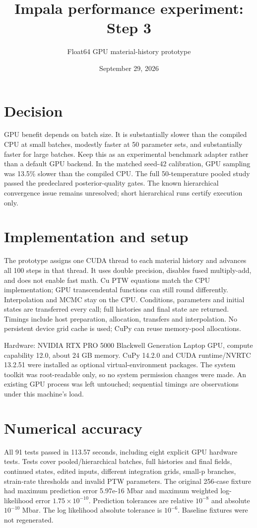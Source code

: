 \documentclass[11pt]{article}
\title{Impala performance experiment: Step 3}
\author{Float64 GPU material-history prototype}
\date{September 29, 2026}
\begin{document}
\maketitle
\section*{Decision}
GPU benefit depends on batch size. It is substantially slower than the compiled
CPU at small batches, modestly faster at 50 parameter sets, and substantially
faster for large batches. Keep this as an experimental benchmark adapter rather
than a default GPU backend. In the matched seed-42 calibration, GPU sampling
was 13.5\% slower than the compiled CPU. The full 50-temperature pooled study passed
the predeclared posterior-quality gates. The known hierarchical convergence
issue remains unresolved; short hierarchical runs certify execution only.
\section*{Implementation and setup}
The prototype assigns one CUDA thread to each material history and advances all
100 steps in that thread. It uses double precision, disables fused multiply-add,
and does not enable fast math. Cu PTW equations match the CPU implementation;
GPU transcendental functions can still round differently. Interpolation and
MCMC stay on the CPU. Conditions, parameters and initial states are transferred
every call; full histories and final state are returned. Timings include host
preparation, allocation, transfers and interpolation. No persistent device grid
cache is used; CuPy can reuse memory-pool allocations.

Hardware: NVIDIA RTX PRO 5000 Blackwell Generation Laptop GPU, compute capability
12.0, about 24 GB memory. CuPy 14.2.0 and CUDA runtime/NVRTC 13.2.51 were installed
as optional virtual-environment packages. The system toolkit was root-readable
only, so no system permission changes were made. An existing GPU process was
left untouched; sequential timings are observations under this machine's load.
\section*{Numerical accuracy}
All 91 tests passed in 113.57 seconds, including eight explicit GPU hardware tests.
Tests cover pooled/hierarchical batches, full histories and final fields,
continued states, edited inputs, different integration grids, small-p branches,
strain-rate thresholds and invalid PTW parameters. The original 256-case fixture
had maximum prediction error 5.97e-16 Mbar and maximum weighted log-likelihood
error $1.75\times10^{-10}$. Prediction tolerances are relative $10^{-8}$
and absolute $10^{-10}$ Mbar. The log likelihood absolute tolerance is $10^{-6}$.
Baseline fixtures were not regenerated.
\end{document}
